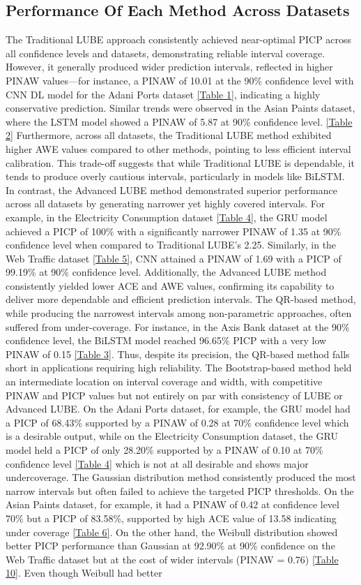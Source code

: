 \subsection{Performance Of Each Method Across Datasets}
The Traditional LUBE approach consistently achieved near-optimal PICP across all confidence levels and datasets, demonstrating reliable interval coverage. However, it generally produced wider prediction intervals, reflected in higher PINAW values—for instance, a PINAW of 10.01 at the 90\% confidence level with CNN DL model for the Adani Ports dataset \ref{Table 1}, indicating a highly conservative prediction. Similar trends were observed in the Asian Paints dataset, where the LSTM model showed a PINAW of 5.87 at 90\% confidence level. \ref{Table 2} Furthermore, across all datasets, the Traditional LUBE method exhibited higher AWE values compared to other methods, pointing to less efficient interval calibration. This trade-off suggests that while Traditional LUBE is dependable, it tends to produce overly cautious intervals, particularly in models like BiLSTM. In contrast, the Advanced LUBE method demonstrated superior performance across all datasets by generating narrower yet highly covered intervals. For example, in the Electricity Consumption dataset \ref{Table 4}, the GRU model achieved a PICP of 100\% with a significantly narrower PINAW of 1.35 at 90\% confidence level when compared to Traditional LUBE's 2.25. Similarly, in the Web Traffic dataset \ref{Table 5}, CNN attained a PINAW of 1.69 with a PICP of 99.19\% at 90\% confidence level. Additionally, the Advanced LUBE method consistently yielded lower ACE and AWE values, confirming its capability to deliver more dependable and efficient prediction intervals. The QR-based method, while producing the narrowest intervals among non-parametric approaches, often suffered from under-coverage. For instance, in the Axis Bank dataset at the 90\% confidence level, the BiLSTM model reached 96.65\% PICP with a very low PINAW of 0.15 \ref{Table 3}. Thus, despite its precision, the QR-based method falls short in applications requiring high reliability. The Bootstrap-based method held an intermediate location on interval coverage and width, with competitive PINAW and PICP values but not entirely on par with consistency of LUBE or Advanced LUBE. On the Adani Ports dataset, for example, the GRU model had a PICP of 68.43\% supported by a PINAW of 0.28 at 70\% confidence level which is a desirable output, while on the Electricity Consumption dataset, the GRU model held a PICP of only 28.20\% supported by a PINAW of 0.10 at 70\% confidence level \ref{Table 4} which is not at all desirable and shows major undercoverage. The Gaussian distribution method consistently produced the most narrow intervals but often failed to achieve the targeted PICP thresholds. On the Asian Paints dataset, for example, it had a PINAW of 0.42 at confidence level 70\% but a PICP of 83.58\%, supported by high ACE value of 13.58 indicating under coverage \ref{Table 6}. On the other hand, the Weibull distribution showed better PICP performance than Gaussian at 92.90\% at 90\% confidence on the Web Traffic dataset but at the cost of wider intervals (PINAW = 0.76) \ref{Table 10}.  Even though Weibull had better 